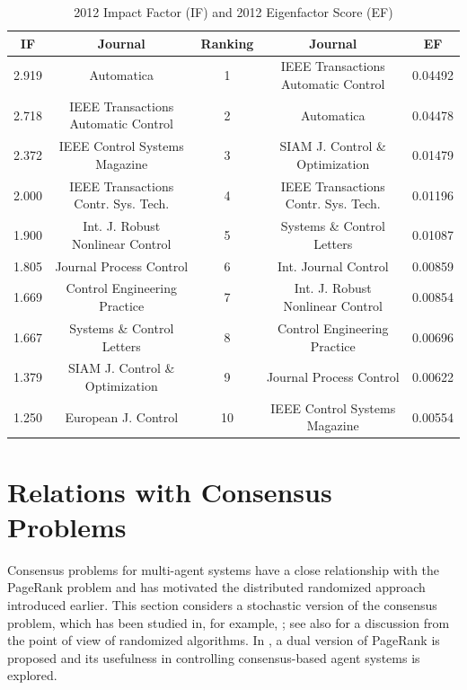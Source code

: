 \documentclass[11pt,draftcls,onecolumn]{IEEEtran}
\begin{document}
\begin{table}[htb]
\caption{2012 Impact Factor (IF) and 2012 Eigenfactor Score %
(EF)}
\label{IFandEI}
\begin{tabular}{|c|c|c|c|c|} \hline
IF & Journal & Ranking & Journal & EF\\ \hline
2.919 & Automatica & 1 & IEEE Transactions Automatic Control & 0.04492\\
2.718 &IEEE Transactions Automatic Control & 2 & Automatica & 0.04478\\
2.372 &IEEE Control Systems Magazine & 3 & SIAM J. Control \& Optimization &0.01479\\
2.000 &IEEE Transactions Contr. Sys. Tech. & 4 & IEEE Transactions Contr. Sys. Tech. & 0.01196\\
1.900 &Int. J. Robust 
Nonlinear Control & 5 & Systems \& Control Letters &0.01087\\
1.805 &Journal Process Control & 6 & Int. Journal Control &0.00859\\
1.669 & Control Engineering Practice & 7 & Int. J. Robust Nonlinear Control&0.00854\\
1.667 &Systems \& Control Letters & 8 & Control Engineering Practice & 0.00696\\
1.379&SIAM J. Control \& Optimization & 9 & Journal Process Control&0.00622\\
1.250&European J. Control & 10 & IEEE Control Systems Magazine& 0.00554\\
\hline
\end{tabular}
\end{table}


%

\section*{Relations with Consensus Problems}

Consensus problems for multi-agent systems have a close relationship with
the PageRank problem and has motivated the distributed randomized approach 
introduced earlier. 
This section considers 
a stochastic version 
of the consensus problem, which has been studied
in, for example, \cite{BoyGhoPra:06,HatMes:05,TahJad:08,Wu:06};
see also \cite{TemIsh:07} for a discussion from the point of view of 
randomized algorithms. 
In \cite{TsuYam:08}, a dual version of PageRank is proposed and
its usefulness in controlling consensus-based agent systems is 
explored.
\end{document}
